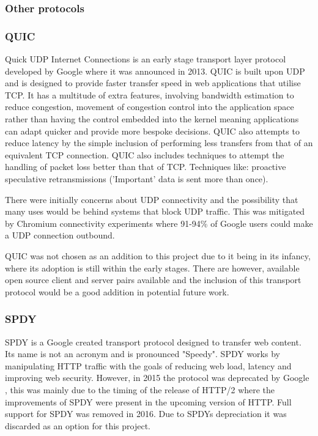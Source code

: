\subsubsection{Other protocols}
\subsubsection*{QUIC}
Quick UDP Internet Connections \citep{hamilton2016quic} is an early stage transport layer protocol developed by Google where it was announced in 2013. QUIC is built upon UDP and is designed to provide faster transfer speed in web applications that utilise TCP.
It has a multitude of extra features, involving bandwidth estimation to reduce congestion, movement of congestion control into the application space rather than having the control embedded into the kernel meaning applications can adapt quicker and provide more bespoke decisions. QUIC also attempts to reduce latency by the simple inclusion of performing less transfers from that of an equivalent TCP connection. QUIC also includes techniques to attempt the handling of packet loss better than that of TCP. Techniques like: proactive speculative retransmissions ('Important' data is sent more than once).

There were initially concerns about UDP connectivity and the possibility that many uses would be behind systems that block UDP traffic. This was mitigated by Chromium connectivity experiments \citep{roskind2013quic} where 91-94\% of Google users could make a UDP connection outbound.

QUIC was not chosen as an addition to this project due to it being in its infancy, where its adoption is still within the early stages. There are however, available open source client and server pairs available and the inclusion of this transport protocol would be a good addition in potential future work.

\subsubsection*{SPDY}
SPDY \citep{belshe2012spdy} is a Google created transport protocol designed to transfer web content. Its name is not an acronym and is pronounced "Speedy". SPDY works by manipulating HTTP traffic with the goals of reducing web load, latency and improving web security. However, in 2015 the protocol was deprecated by Google \citep{blog2015hello}, this was mainly due to the timing of the release of HTTP/2 where the improvements of SPDY were present in the upcoming version of HTTP. Full support for SPDY was removed in 2016. Due to SPDYs depreciation it was discarded as an option for this project.

